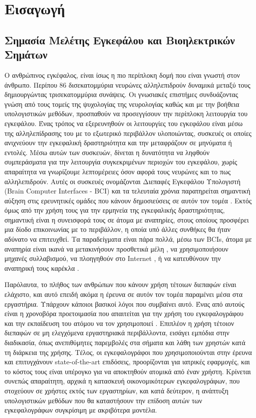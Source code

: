 \documentclass[11pt,a4paper,english,greek,twoside]{../Thesis}
\begin{document}
\chapter{Εισαγωγή}
\section{Σημασία Μελέτης Εγκεφάλου και Βιοηλεκτρικών Σημάτων}
\label{sec:importance}
Ο ανθρώπινος εγκέφαλος, είναι ίσως η πιο περίπλοκη δομή που είναι γνωστή στον άνθρωπο. Περίπου 86 δισεκατομμύρια νευρώνες \cite{Herculano-Houzel2009-vm} αλληλεπιδρούν δυναμικά μεταξύ τους δημιουργώντας τρισεκατομμύρια συνάψεις. Οι γνωσιακές επιστήμες συνδυάζοντας γνώση από τους τομείς της ψυχολογίας της νευρολογίας καθώς και με την βοήθεια υπολογιστικών μεθόδων, προσπαθούν να προσεγγίσουν την περίπλοκη λειτουργία του εγκεφάλου. Ένας τρόπος να εξερευνηθούν οι λειτουργίες του εγκεφάλου είναι μέσω της αλληλεπίδρασης του με το εξωτερικό περιβάλλον υλοποιώντας, συσκευές οι οποίες ανιχνεύουν την εγκεφαλική δραστηριότητα και την μεταφράζουν σε μηνύματα ή εντολές. Μέσω αυτών των συσκευών, δίνεται η δυνατότητα να ληφθούν συμπεράσματα για την λειτουργία συγκεκριμένων περιοχών του εγκεφάλου, χωρίς απαραίτητα να γνωρίζουμε λεπτομέρειες όσον αφορά τους νευρώνες και το πως αλληλεπιδρούν. Αυτές οι συσκευές ονομάζονται Διεπαφές Εγκεφάλου Υπολογιστή (Brain Computer Interfaces - BCI) και τα τελευταία χρόνια παρατηρείται σημαντική αύξηση στις ερευνητικές ομάδες που κάνουν δημοσιεύσεις σε αυτόν τον τομέα \cite{nicolas2012brain}. Εκτός όμως από την χρήση τους για την ερμηνεία της εγκεφαλικής δραστηριότητας, σημαντική είναι η συνεισφορά τους σε άτομα με αναπηρίες, στους οποίους προσφέρει μια δίοδο επικοινωνίας με το περιβάλλον, η οποία υπό άλλες συνθήκες θα ήταν αδύνατο να επιτευχθεί. Τα παραδείγματα είναι πάρα πολλά, μέσω των BCIs, άτομα με αναπηρία είναι ικανά να μετακινήσουν προσθετικά μέλη \cite{}, να χρησιμοποιήσουν μηχανές συλλαβισμού, να πλοηγηθούν στο Internet \cite{}, ή να κατευθύνουν την αναπηρική τους καρέκλα \cite{}.  \cite{Farwell1988TalkingPotentials}
\par Παρόλαυτα, το πλήθος των ανθρώπων που κάνουν χρήση τέτοιων διεπαφών είναι ελάχιστο, και αυτό επειδή ακόμα η έρευνα σε αυτόν τον τομέα παραμένει μέσα στα εργαστήρια. Υπάρχουν κάποιοι βασικοί λόγοι που συμβαίνει αυτό. Ένας από αυτούς είναι η χρονοβόρα προετοιμασία που απαιτείται για την χρήση του εγκεφαλογράφου και την εκπαίδευση του ατόμου να τον χρησιμοποιεί \cite{blankertz2010berlin}. Επιπλέον η χρήση τέτοιον διεπαφών σε μη ελεγχόμενα εργαστηριακά περιβάλλοντα, εισάγει εμπόδια στην διαδικασία, όπως ανεπιθύμητες παρεμβολές στα σήματα και λάθη των χρηστών κατά τη διάρκεια της χρήσης. Τέλος, οι εγκεφαλογράφοι που χρησιμοποιούνται στην έρευνα και επιτυγχάνουν state-of-the-art επιδόσεις, προορίζονται για ιατρικές εφαρμογές, και το κόστος τους είναι υπέρογκο για να αποκτηθούν ατομικά από έναν χρήστη. Κρίνεται συνεπώς απαραίτητη, αρχικά η κατασκευή οικονομικότερων εγκεφαλογράφων, που στοχεύουν σε χρήστες εκτός των εργαστηρίων, και κατά δεύτερον, η ανάπτυξη υπολογιστικών μεθόδων που θα καταστήσουν την επίδοση αυτών των εγκεφαλογράφων συγκρίσιμη με ακριβότερα μοντέλα. 
\end{document}
